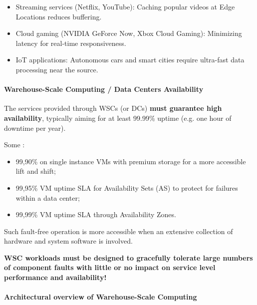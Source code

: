 \begin{examplebox}
    \begin{itemize}
        \item Streaming services (Netflix, YouTube): Caching popular videos at Edge Locations reduces buffering.
        \item Cloud gaming (NVIDIA GeForce Now, Xbox Cloud Gaming): Minimizing latency for real-time responsiveness.
        \item IoT applications: Autonomous cars and smart cities require ultra-fast data processing near the source.
    \end{itemize}
\end{examplebox}

\newpage

\paragraph{Warehouse-Scale Computing / Data Centers Availability}

The services provided through WSCs (or DCs) \textbf{must guarantee high availability}, typically aiming for at least 99.99\% uptime (e.g. one hour of downtime per year).

\highspace
Some :
\begin{itemize}
    \item 99,90\% on single instance VMs with premium storage for a more accessible lift and shift;
    
    \item 99,95\% VM uptime SLA for Availability Sets (AS) to protect for failures within a data center;

    \item 99,99\% VM uptime SLA through Availability Zones.
\end{itemize}
Such fault-free operation is more accessible when an extensive collection of hardware and system software is involved.

\highspace
\textbf{WSC workloads must be designed to gracefully tolerate large numbers of component faults with little or no impact on service level performance and availability!}

\hfill

\longline

\hfill

\paragraph{Architectural overview of Warehouse-Scale Computing}

